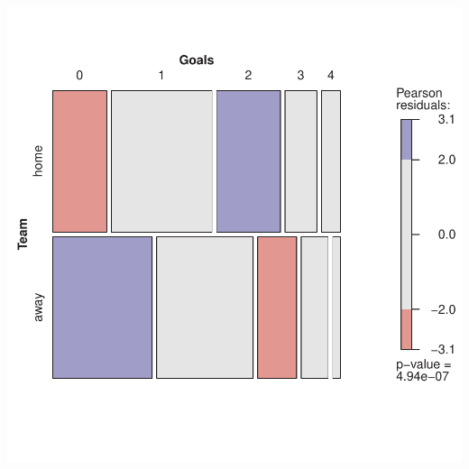 \documentclass[10pt]{report}\usepackage[]{graphicx}\usepackage[]{color}
\newenvironment{knitrout}{}{} %
\renewenvironment{knitrout}{\small\renewcommand{\baselinestretch}{.85}}{} %
\begin{document}
\begin{Exercises}
\begin{enumerate*}
\begin{ans}
\begin{knitrout}
\centerline{\includegraphics[width=.5\textwidth]{soln/fig/ex2_5d-mosaic-1} }



\end{knitrout}
    \end{ans}
    

  \end{enumerate*}


\end{Exercises}
\end{document}
